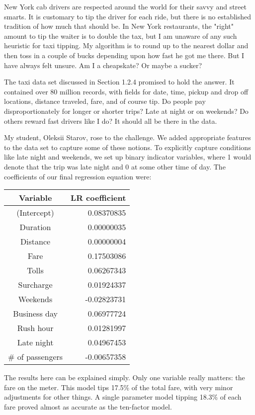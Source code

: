 \documentclass[10pt]{article}
\begin{document}
New York cab drivers are respected around the world for their savvy and street smarts. It is customary to tip the driver for each ride, but there is no established tradition of how much that should be. In New York restaurants, the "right" amount to tip the waiter is to double the tax, but I am unaware of any such heuristic for taxi tipping. My algorithm is to round up to the nearest dollar and then toss in a couple of bucks depending upon how fast he got me there. But I have always felt unsure. Am I a cheapskate? Or maybe a sucker?

The taxi data set discussed in Section 1.2.4 promised to hold the answer. It contained over 80 million records, with fields for date, time, pickup and drop off locations, distance traveled, fare, and of course tip. Do people pay disproportionately for longer or shorter trips? Late at night or on weekends? Do others reward fast drivers like I do? It should all be there in the data.

My student, Oleksii Starov, rose to the challenge. We added appropriate features to the data set to capture some of these notions. To explicitly capture conditions like late night and weekends, we set up binary indicator variables, where 1 would denote that the trip was late night and 0 at some other time of day. The coefficients of our final regression equation were:

\begin{center}
\begin{tabular}{c|r}
Variable & LR coefficient \\
\hline
(Intercept) & 0.08370835 \\
Duration & 0.00000035 \\
Distance & 0.00000004 \\
Fare & 0.17503086 \\
Tolls & 0.06267343 \\
Surcharge & 0.01924337 \\
Weekends & -0.02823731 \\
Business day & 0.06977724 \\
Rush hour & 0.01281997 \\
Late night & 0.04967453 \\
\# of passengers & -0.00657358 \\
\end{tabular}
\end{center}

The results here can be explained simply. Only one variable really matters: the fare on the meter. This model tips 17.5\% of the total fare, with very minor adjustments for other things. A single parameter model tipping 18.3\% of each fare proved almost as accurate as the ten-factor model.
\end{document}

